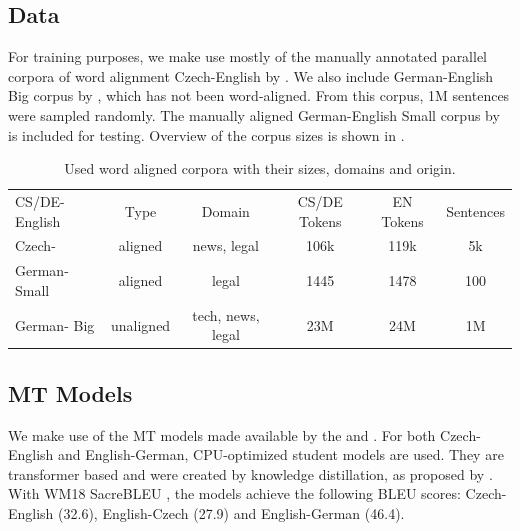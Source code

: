 \subsection{Data}

For training purposes, we make use mostly of the manually annotated parallel corpora of word alignment Czech-English by \citet{marecek_csen_algn_corpus}. We also include German-English Big corpus by \citet{rozis_tilde}, which has not been word-aligned. From this corpus, 1M sentences were sampled randomly. The manually aligned German-English Small corpus by \citet{bicini_ende_algn_corpus} is included for testing. Overview of the corpus sizes is shown in .

\begin{table}[h!]
    \center
    \begin{tabular}{lccccc}
        \toprule
        CS/DE-English & Type & Domain &\hspace{-0.1cm}CS/DE Tokens & EN Tokens & Sentences \\
        \cmidrule{1-6}
        Czech- & aligned & news, legal & 106k & 119k & 5k \\
        German- Small\hspace{-0.2cm} & aligned & legal & 1445 & 1478 & 100 \\
        German- Big & unaligned &tech, news, legal & 23M & 24M & 1M \\
        \bottomrule
    \end{tabular}
    \caption{Used word aligned corpora with their sizes, domains and origin. \label{tab:corpus_used}}
\end{table}

\subsection{MT Models}

We make use of the MT models made available by the \citet{model_csen} and \citet{model_deen}. For both Czech-English and English-German, CPU-optimized student models are used. They are transformer based \citep{vaswani2017transformer} and were created by knowledge distillation, as proposed by \citet{germann-EtAl:2020:WMT}. With WM18 SacreBLEU \citep{sacrebleu}, the models achieve the following BLEU scores: Czech-English (32.6), English-Czech (27.9) and English-German (46.4).